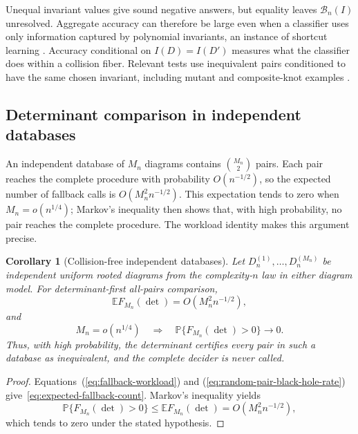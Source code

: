 \documentclass[9pt,twoside]{pnas-new}
\newtheorem{corollary}[theorem]{Corollary}
\theoremstyle{definition}
\theoremstyle{remark}
\renewcommand{\Pr}{\mathbb{P}}
\begin{document}
Unequal invariant values give sound negative answers, but equality leaves $\mathcal B_n(I)$ unresolved.  Aggregate accuracy can therefore be large even when a classifier uses only information captured by polynomial invariants, an instance of shortcut learning \cite{geirhosetal2020}.  Accuracy conditional on $I(D)=I(D')$ measures what the classifier does within a collision fiber.  Relevant tests use inequivalent pairs conditioned to have the same chosen invariant, including mutant and composite-knot examples \cite{sleimanetal2024}.

\subsection{Determinant comparison in independent databases}
An independent database of $M_n$ diagrams contains $\binom{M_n}{2}$ pairs.  Each pair reaches the complete procedure with probability $O(n^{-1/2})$, so the expected number of fallback calls is $O(M_n^2n^{-1/2})$.  This expectation tends to zero when $M_n=o(n^{1/4})$; Markov's inequality then shows that, with high probability, no pair reaches the complete procedure.  The workload identity makes this argument precise.

\begin{corollary}[Collision-free independent databases]
\label{cor:no-fallback-database}
Let $D_n^{(1)},\ldots,D_n^{(M_n)}$ be independent uniform rooted diagrams from the complexity-$n$ law in either diagram model.  For determinant-first all-pairs comparison,
\begin{equation}
 \mathbb E F_{M_n}(\det)
 =O(M_n^2n^{-1/2}),
 \label{eq:expected-fallback-count}
\end{equation}
and
\begin{equation}
 M_n=o(n^{1/4})
 \quad\Longrightarrow\quad
 \Pr\{F_{M_n}(\det)>0\}\longrightarrow0.
 \label{eq:no-fallback-scale}
\end{equation}
Thus, with high probability, the determinant certifies every pair in such a database as inequivalent, and the complete decider is never called.
\end{corollary}

\begin{proof}
Equations~(\ref{eq:fallback-workload}) and (\ref{eq:random-pair-black-hole-rate}) give~\eqref{eq:expected-fallback-count}.  Markov's inequality yields
\[
 \Pr\{F_{M_n}(\det)>0\}
 \le \mathbb E F_{M_n}(\det)
 =O(M_n^2n^{-1/2}),
\]
which tends to zero under the stated hypothesis.
\end{proof}
\end{document}

